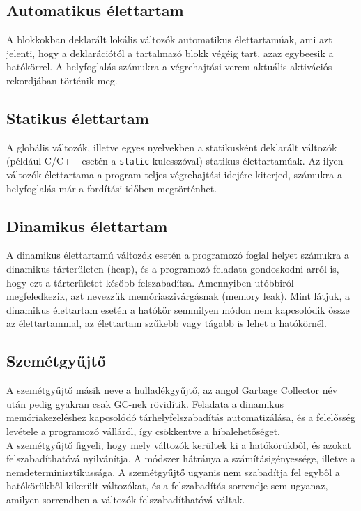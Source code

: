 \documentclass[12pt,margin=0px]{article}
\begin{document}
	\subsection{Automatikus élettartam}
	
    A blokkokban deklarált lokális változók automatikus élettartamúak, ami azt jelenti, hogy a deklarációtól a tartalmazó blokk végéig tart, azaz egybeesik a hatókörrel. A helyfoglalás számukra a végrehajtási verem aktuális aktivációs rekordjában történik meg.
	
	\subsection{Statikus élettartam}
	
    A globális változók, illetve egyes nyelvekben a statikusként deklarált változók (például C/C++ esetén a \texttt{static} kulcsszóval) statikus élettartamúak. Az ilyen változók élettartama a program teljes végrehajtási idejére kiterjed, számukra a helyfoglalás már a fordítási időben megtörténhet.
	
	\subsection{Dinamikus élettartam}
	
    A dinamikus élettartamú változók esetén a programozó foglal helyet számukra a dinamikus tárterületen (heap), és a programozó feladata gondoskodni arról is, hogy ezt a tárterületet később felszabadítsa. Amennyiben utóbbiról megfeledkezik, azt nevezzük memóriaszivárgásnak (memory leak).
    Mint látjuk, a dinamikus élettartam esetén a hatókör semmilyen módon nem kapcsolódik össze az élettartammal, az élettartam szűkebb vagy tágabb is lehet a hatókörnél.
	
	\subsection{Szemétgyűjtő}
	
    \noindent A szemétgyűjtő másik neve a hulladékgyűjtő, az angol Garbage Collector név után pedig gyakran csak GC-nek rövidítik. Feladata a dinamikus memóriakezeléshez kapcsolódó tárhelyfelszabadítás automatizálása, és a felelősség levétele a programozó válláról, így csökkentve a hibalehetőséget.\\
	
    \noindent A szemétgyűjtő figyeli, hogy mely változók kerültek ki a hatókörükből, és azokat felszabadíthatóvá nyilvánítja. A módszer hátránya a számításigényessége, illetve a nemdeterminisztikussága. A szemétgyűjtő ugyanis nem szabadítja fel egyből a hatókörükből kikerült változókat, és a felszabadítás sorrendje sem ugyanaz, amilyen sorrendben a változók felszabadíthatóvá váltak.\\
	
\end{document}
